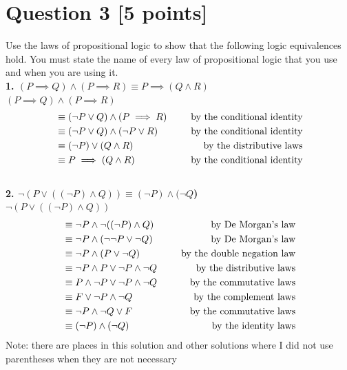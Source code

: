 \documentclass{report}
\theoremstyle{mytheoremstyle}
\theoremstyle{mytheoremstyle}
\theoremstyle{myproblemstyle}
\begin{document}
\section*{Question 3 [5 points]}
Use the laws of propositional logic to show that the following logic equivalences hold. You must state the name of every law of propositional logic that you use and when you are using it.
\\[\baselineskip]
\noindent\textbf{1. $(P \implies Q) \land (P \implies R) \equiv P \implies (Q \land R)$}
\\[\baselineskip]
$(P \implies Q) \land (P \implies R)$
\begin{align}
    &\equiv (\neg P \lor Q) \land (P \implies R) &\text{\indent by the conditional identity} \\
    &\equiv (\neg P \lor Q) \land (\neg P \lor R) &\text{\indent by the conditional identity} \\
    &\equiv (\neg P) \lor (Q \land R) &\text{\indent by the distributive laws} \\
    &\equiv P \implies (Q \land R) &\text{\indent by the conditional identity}
\end{align} 
\\[\baselineskip]
\noindent\textbf{2. $\neg (P \lor ((\neg P) \land Q)) \equiv (\neg P) \land (\neg Q$)} 
\\[\baselineskip]
$\neg (P \lor ((\neg P) \land Q))$
\begin{align}
    &\equiv \neg P \land \neg ((\neg P) \land Q) &\text{\indent by De Morgan's law} \\
    &\equiv \neg P \land (\neg \neg P \lor \neg Q) &\text{\indent by De Morgan's law} \\
    &\equiv \neg P \land (P \lor \neg Q) &\text{\indent by the double negation law} \\
    &\equiv \neg P \land P \lor \neg P \land \neg Q &\text{\indent by the distributive laws} \\
    &\equiv P \land \neg P \lor \neg P \land \neg Q &\text{\indent by the commutative laws} \\
    &\equiv F \lor \neg P \land \neg Q &\text{\indent by the complement laws} \\
    &\equiv \neg P \land \neg Q \lor F &\text{\indent by the commutative laws} \\
    &\equiv (\neg P) \land (\neg Q) &\text{\indent by the identity laws}
\end{align}
\footnotesize{Note: there are places in this solution and other solutions where I did not use parentheses when they are not necessary}
\end{document}
